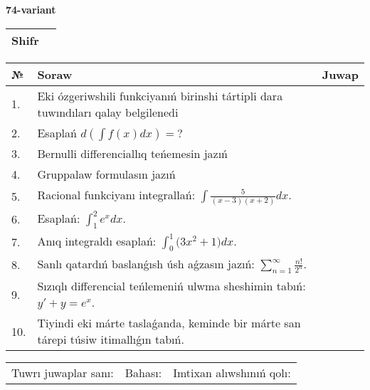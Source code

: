 \documentclass{article}
\begin{document}
  \egroup
  
  \newpage
  
  
  \textbf{74-variant}\\
  
  \bgroup
  \def\arraystretch{1.6} %
  
  \begin{tabular}{|m{5.7cm}|m{9.5cm}|}
  \hline
  Shifr & \\
  \hline
  \end{tabular}
  
  \vspace{1cm}
  
  \begin{tabular}{|m{0.7cm}|m{10cm}|m{4cm}|}
  \hline
  № & Soraw & Juwap \\
  \hline
  1. & Eki ózgeriwshili funkciyanıń birinshi tártipli dara tuwındıları qalay belgilenedi &  \\
  \hline
  2. & Esaplań \(d\left( \int{f(x)dx} \right) = ?\) &  \\
  \hline
  3. & Bernulli differenciallıq teńemesin jazıń &  \\
  \hline
  4. & Gruppalaw formulasın jazıń &  \\
  \hline
  5. & Racional funkciyanı integrallań: \(\int{\frac{5}{(x - 3)(x + 2)}dx}\). &  \\
  \hline
  6. & Esaplań: \(\int_{1}^2 {e^{x}dx}\). &  \\
  \hline
  7. & Anıq integraldı esaplań: \(\int_{0}^{1}{(3x^2 } + 1)dx\). &  \\
  \hline
  8. & Sanlı qatardıń baslanǵısh úsh aǵzasın jazıń: \(\sum_{n = 1}^{\infty}\frac{n!}{2^{n}}\). &  \\
  \hline
  9. & Sızıqlı differencial teńlemeniń ulwma sheshimin tabıń: \(y' + y = e^{x}\). &  \\
  \hline
  10. & Tiyindi eki márte taslaǵanda, keminde bir márte san tárepi túsiw itimallıǵın tabıń. &  \\
  \hline
  \end{tabular}
  
  \vspace{1cm}
  
  \begin{tabular}{lll}
  Tuwrı juwaplar sanı: \underline{\hspace{1.5cm}} & 
  Bahası: \underline{\hspace{1.5cm}} & 
  Imtixan alıwshınıń qolı: \underline{\hspace{2cm}} \\
  \end{tabular}
  
\end{document}
